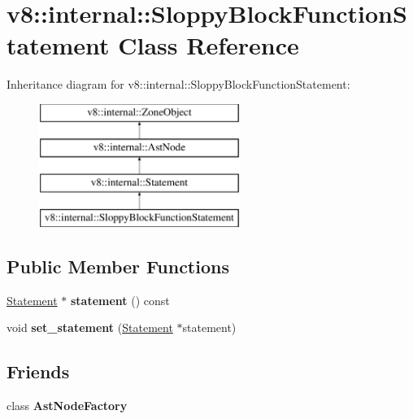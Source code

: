 \hypertarget{classv8_1_1internal_1_1SloppyBlockFunctionStatement}{}\section{v8\+:\+:internal\+:\+:Sloppy\+Block\+Function\+Statement Class Reference}
\label{classv8_1_1internal_1_1SloppyBlockFunctionStatement}
Inheritance diagram for v8\+:\+:internal\+:\+:Sloppy\+Block\+Function\+Statement\+:\begin{figure}[H]
\begin{center}
\leavevmode
\includegraphics[height=4.000000cm]{classv8_1_1internal_1_1SloppyBlockFunctionStatement}
\end{center}
\end{figure}
\subsection*{Public Member Functions}
\begin{DoxyCompactItemize}
\item 
\mbox{\label{classv8_1_1internal_1_1SloppyBlockFunctionStatement_a6d15b6b485ba075e2829c99f76d798ca}} 
\mbox{\hyperlink{classv8_1_1internal_1_1Statement}{Statement}} $\ast$ {\bfseries statement} () const
\item 
\mbox{\label{classv8_1_1internal_1_1SloppyBlockFunctionStatement_ab4722617726a5ab849a36a4073d91ad1}} 
void {\bfseries set\+\_\+statement} (\mbox{\hyperlink{classv8_1_1internal_1_1Statement}{Statement}} $\ast$statement)
\end{DoxyCompactItemize}
\subsection*{Friends}
\begin{DoxyCompactItemize}
\item 
\mbox{\label{classv8_1_1internal_1_1SloppyBlockFunctionStatement_a8d587c8ad3515ff6433eb83c578e795f}} 
class {\bfseries Ast\+Node\+Factory}
\end{DoxyCompactItemize}
